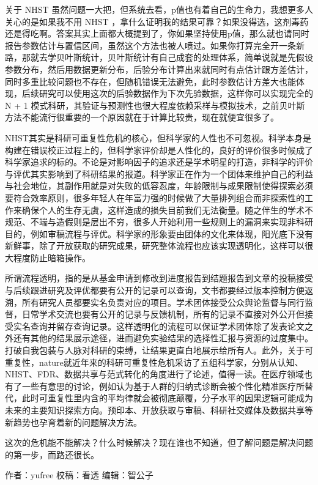 \documentclass[]{book}
\begin{document}
关于 NHST 虽然问题一大把，但系统去看，p值也有着自己的生命力，我想更多人关心的是如果我不用 NHST ，拿什么证明我的结果可靠？如果没得选，这剂毒药还是得吃啊。答案其实上面都大概提到了，你如果坚持使用p值，那么就也请同时报告参数估计与置信区间，虽然这个方法也被人喷过。如果你打算完全开一条新路，那就去学贝叶斯统计，贝叶斯统计有自己成套的处理体系，简单说就是先假设参数分布，然后用数据更新分布，后验分布计算出来就同时有点估计跟方差估计，同时多重比较问题也不存在，但随机错误无法避免，此时参数估计方差大也能体现，后续研究可以使用这次的后验数据作为下次先验数据，这样你可以实现完全的 N + 1 模式科研，其验证与预测性也很大程度依赖采样与模拟技术，之前贝叶斯方法不能流行很重要的一个原因就在于计算比较贵，现在就便宜很多了。

NHST其实是科研可重复性危机的核心，但科学家的人性也不可忽视。科学本身是构建在错误校正过程上的，但科学家评价却是人性化的，良好的评价很多时候成了科学家追求的标的。不论是对影响因子的追求还是学术明星的打造，非科学的评价与评优其实影响到了科研结果的报道。科学家正在作为一个团体来维护自己的利益与社会地位，其副作用就是对失败的低容忍度，年龄限制与成果限制使得探索必须要符合效率原则，很多年轻人在年富力强的时候做了大量排列组合而非探索性的工作来确保个人的生存无虞，这样造成的损失目前我们无法衡量。随之伴生的学术不规范、不端与造假则是层出不穷，很多人开始利用一些规则上的漏洞来实现非科研目的，例如审稿流程与评优。科学家的形象要由团体的文化来体现，阳光底下没有新鲜事，除了开放获取的研究成果，研究整体流程也应该实现透明化，这样可以很大程度防止暗箱操作。

所谓流程透明，指的是从基金申请到修改到进度报告到结题报告到文章的投稿接受与后续跟进研究及评优都要有公开的记录可以查询，文书都要经过版本控制方便返溯，所有研究人员都要实名负责对应的项目。学术团体接受公众舆论监督与同行监督，日常学术交流也要有公开的记录与反馈机制，所有的记录不直接对外公开但接受实名查询并留存查询记录。这样透明化的流程可以保证学术团体除了发表论文之外还有其他的结果展示途径，进而避免实验结果的选择性汇报与资源的过度集中。打破自我包装与人脉对科研的束缚，让结果更直白地展示给所有人。此外，关于可重复性，nature就近年来的科研可重复性危机采访了五组科学家，分别从认知、NHST、FDR、数据共享与范式转化的角度进行了论述，值得一读。在医疗领域也有了一些有意思的讨论，例如认为基于人群的归纳式诊断会被个性化精准医疗所替代，此时可重复性里内含的平均律就会被彻底颠覆，分子水平的因果逻辑可能成为未来的主要知识探索方向。预印本、开放获取与审稿、科研社交媒体及数据共享等新趋势也孕育着新的问题解决方法。

这次的危机能不能解决？什么时候解决？现在谁也不知道，但了解问题是解决问题的第一步，而路还很长。

作者：yufree
校稿：看透
编辑：智公子
\end{document}
